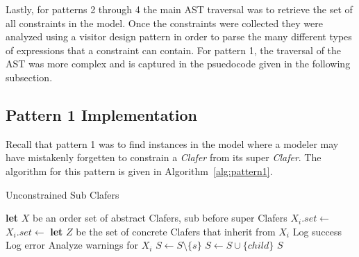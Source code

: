 \documentclass[10pt,oneside]{IEEEtran}
\begin{document}
Lastly, for patterns 2 through 4 the main AST traversal was to retrieve the set of all constraints in the model. Once the constraints were collected they were analyzed using a visitor design pattern in order to parse the many different types of expressions that a constraint can contain. For pattern 1, the traversal of the AST was more complex and is captured in the psuedocode given in the following subsection.

\subsection{Pattern 1 Implementation}
Recall that pattern 1 was to find instances in the model where a modeler may have mistakenly forgetten to constrain a \textit{Clafer} from its super \textit{Clafer}. The algorithm for this pattern is given in Algorithm~\ref{alg:pattern1}.

\begin{algorithm}[H]
\caption{Unconstrained Sub Clafers}\label{alg:pattern1}
\begin{algorithmic}[1]
  \State \textbf{let} $X$ be an order set of abstract Clafers, sub before super Clafers
      \State $X_i.set \gets$ 
    \Else
      \State $X_i.set \gets$ 
    \EndIf
  \EndFor
    \State \textbf{let} $Z$ be the set of concrete Clafers that inherit from $X_i$
          \State Log success
        \Else
          \State Log error
        \EndIf
      \EndFor
      \State Analyze warnings for $X_i$
    \EndFor
  \EndFor
\EndProcedure
{}
      \State $S \gets S \setminus \{s\}$
    \EndIf
   \EndFor
      \State $S \gets S \cup \{child\}$
    \EndIf
   \EndFor
   \State \Return $S$
\EndProcedure
\end{algorithmic}
\end{algorithm}
\end{document}
